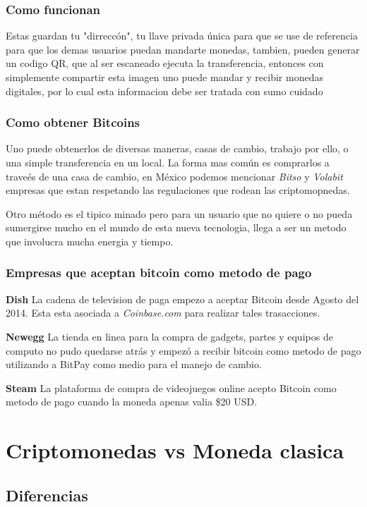 \documentclass[12pt,letterpaper]{article}
\begin{document}
        \subsubsection*{Como funcionan}
            Estas guardan tu "dirrecc\'on", tu llave privada \'unica para que se use de referencia para que los demas usuarios puedan mandarte monedas, tambien, pueden generar un codigo QR, que al ser escaneado ejecuta la transferencia, entonces con simplemente compartir esta imagen uno puede mandar y recibir monedas digitales, por lo cual esta informacion debe ser tratada con sumo cuidado                                

            \subsubsection*{Como obtener Bitcoins}
	Uno puede obtenerlos de diversas maneras, casas de cambio, trabajo por ello, o una simple transferencia en un local. La forma mas com\'un es comprarlos a trave\'es de una casa de cambio, en M\'exico podemos mencionar \textit{Bitso} y \textit{Volabit} empresas que estan respetando las regulaciones que rodean las criptomopnedas.
	
	Otro m\'etodo es el tipico minado pero para un usuario que no quiere o no pueda sumergirse mucho en el mundo de esta nueva tecnologia, llega a ser un metodo que involucra mucha energia y tiempo.
            \subsubsection*{Empresas que aceptan bitcoin como metodo de pago}
\textbf{Dish}
La cadena de television de paga empezo a aceptar Bitcoin desde Agosto del 2014. Esta esta asociada a \textit{Coinbase.com} para realizar tales trasacciones.

\textbf{Newegg}
La tienda en linea para la compra de gadgets, partes y equipos de computo no pudo quedarse atr\'as y empez\'o a recibir bitcoin como metodo de pago utilizando a BitPay como medio para el manejo de cambio.

\textbf{Steam}
La plataforma de compra de videojuegos online acepto Bitcoin como metodo de pago cuando la moneda apenas valia \$20 USD.
\section*{Criptomonedas vs Moneda clasica}

	\subsection*{Diferencias}
\end{document}
